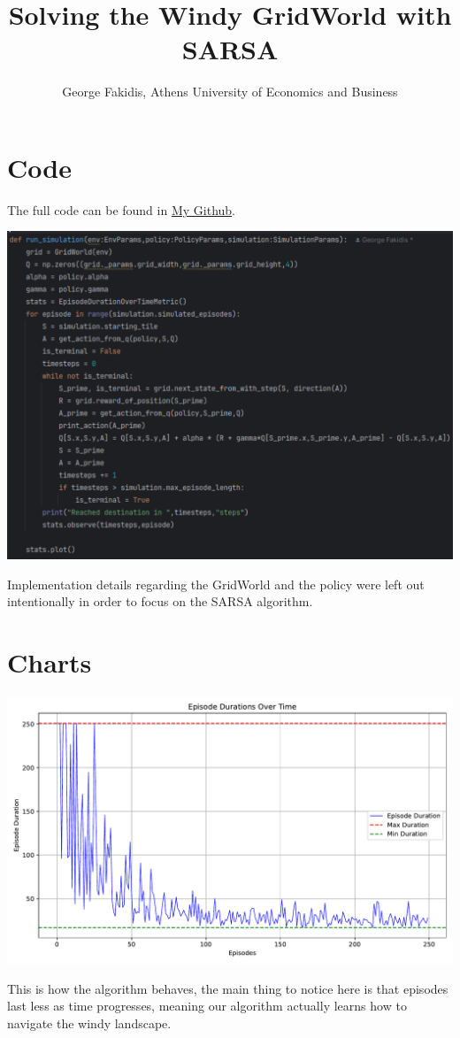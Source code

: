 \documentclass{article}
\title{Solving the Windy GridWorld with SARSA}
\author{George Fakidis, Athens University of Economics and Business}
\begin{document}
\maketitle

\section{Code}
The full code can be found in \href{https://github.com/GeorgeFkd/aueb-cs-masters/blob/master/reinforcement-learning/RL-hw6.py}{My Github}.

\includegraphics[scale=0.9,center]{img.pdf}

Implementation details regarding the GridWorld and the policy were left out intentionally in order to focus on the SARSA algorithm.
\section{Charts}
\includegraphics[scale=0.8,center]{Windy Grid World with SARSA.pdf}
\par
This is how the algorithm behaves, the main thing to notice here is that episodes
last less as time progresses, meaning our algorithm actually learns how to navigate
the windy landscape.
\end{document}
